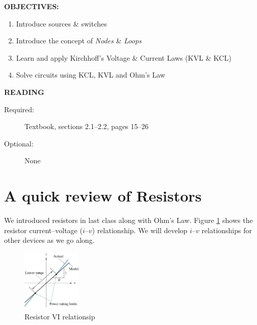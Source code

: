 \documentclass{handout}
\begin{document}
\maketitle



\textbf{OBJECTIVES:}
\begin{enumerate}
\item Introduce sources \& switches
\item Introduce the concept of {\em Nodes} \& {\em Loops}
\item Learn and apply Kirchhoff's Voltage \& Current Laws (KVL \& KCL)
\item Solve circuits using KCL, KVL and Ohm's Law

\end{enumerate}

\textbf{READING}
\begin{description}
\item [Required:] Textbook, sections 2.1--2.2, pages 15--26
\item [Optional:]None
\end{description}



\section{A quick review of Resistors}
We introduced resistors in last class along with Ohm's Law. Figure \ref{fig: Resistor_VI_Relationship} shows the resistor current--voltage ($i$--$v$) relationship.  We will develop $i$--$v$ relationships for other devices as we go along.

\begin{figure}[h b]
\centering
\includegraphics[width=0.25\textwidth]{Resistor_VI_Relationship.jpg}
\caption{Resistor VI relationsip}
\label{fig: Resistor_VI_Relationship}
\end{figure}
\end{document}
